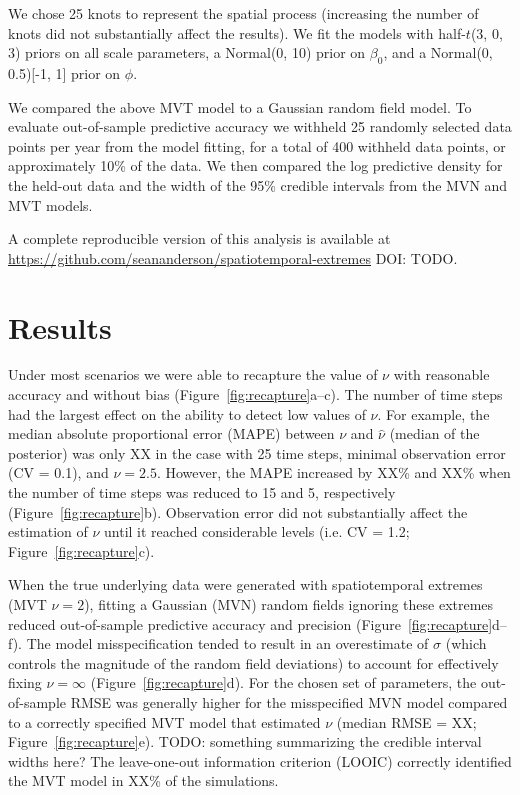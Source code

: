 \documentclass[12pt,english]{article}
\begin{document}
\begin{spacing}{1.3}
We chose 25 knots to represent the spatial process
(increasing the number of knots did not substantially affect the results).
We fit the models with half-$t$(3, 0, 3) priors on all
scale parameters,
a Normal(0, 10) prior on $\beta_0$,
and a Normal(0, 0.5)[-1, 1] prior on $\phi$.

We compared the above MVT
model to a Gaussian random field model.
To evaluate out-of-sample predictive accuracy we withheld
25 randomly selected data points
per year from the model fitting,
for a total of 400 withheld data points,
or approximately 10\% of the data.
We then compared the log predictive density for the held-out data
and the width of the 95\% credible intervals
from the MVN and MVT models.

A complete reproducible version of this analysis is available at
\url{https://github.com/seananderson/spatiotemporal-extremes} DOI: TODO.

\section{Results}

Under most scenarios we were able to recapture the value of $\nu$ with
reasonable accuracy and without bias (Figure~\ref{fig:recapture}a--c).
The number of time steps had the largest effect on the ability to detect low
values of $\nu$. For example, the median absolute proportional error (MAPE)
between $\nu$ and $\hat{\nu}$ (median of the posterior) was only XX in the case
with 25 time steps, minimal observation error (CV = 0.1), and $\nu = 2.5$.
However, the MAPE increased by XX\% and XX\% when the number of time steps was
reduced to 15 and 5, respectively (Figure~\ref{fig:recapture}b).
Observation error did not substantially affect the estimation of $\nu$ until it
reached considerable levels (i.e. CV = 1.2; Figure~\ref{fig:recapture}c).

When the true underlying data were generated with spatiotemporal extremes (MVT
$\nu = 2$), fitting a Gaussian (MVN) random fields ignoring these extremes
reduced out-of-sample predictive accuracy and precision
(Figure~\ref{fig:recapture}d--f). The model misspecification tended to result
in an overestimate of $\sigma$ (which controls the magnitude of the random
field deviations) to account for effectively fixing $\nu = \infty$
(Figure~\ref{fig:recapture}d). For the chosen set of parameters, the
out-of-sample RMSE was generally higher for the misspecified MVN model compared
to a correctly specified MVT model that estimated $\nu$ (median RMSE = XX;
Figure~\ref{fig:recapture}e). TODO: something summarizing the credible interval
widths here? The leave-one-out information criterion (LOOIC) correctly
identified the MVT model in XX\% of the simulations.


\end{spacing}
\end{document}
